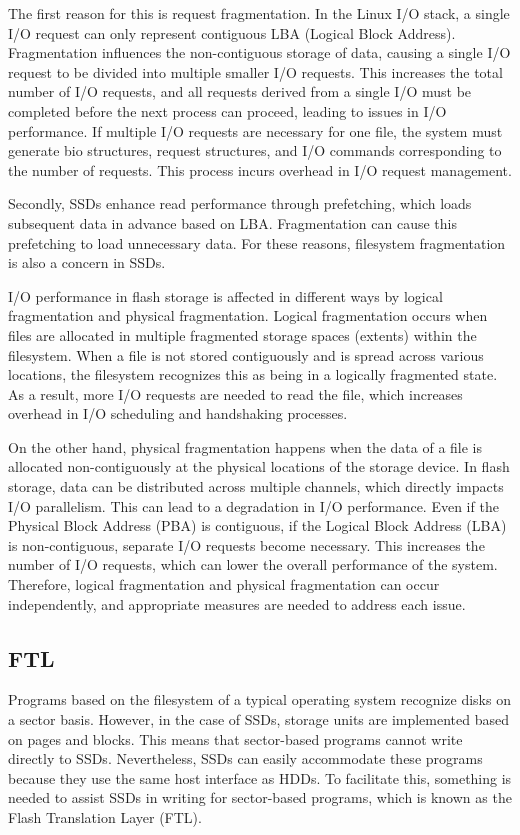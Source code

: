 The first reason for this is request fragmentation.
In the Linux I/O stack, a single I/O request can only represent contiguous LBA (Logical Block Address). 
Fragmentation influences the non-contiguous storage of data, causing a single I/O request to be divided into multiple smaller I/O requests.\cite{IO} 
This increases the total number of I/O requests, and all requests derived from a single I/O must be completed before the next process can proceed, leading to issues in I/O performance.
If multiple I/O requests are necessary for one file, the system must generate bio structures, request structures, and I/O commands corresponding to the number of requests. This process incurs overhead in I/O request management.

Secondly, SSDs enhance read performance through prefetching, which loads subsequent data in advance based on LBA. 
Fragmentation can cause this prefetching to load unnecessary data.\cite{Defragmentation_Log_write_is_ssd_to_bad} For these reasons, filesystem fragmentation is also a concern in SSDs.

 I/O performance in flash storage is affected in different ways by logical fragmentation and physical fragmentation.\cite{Logical_Fragmentation_vs_physical_Fragmentation}
Logical fragmentation occurs when files are allocated in multiple fragmented storage spaces (extents) within the filesystem.
When a file is not stored contiguously and is spread across various locations, the filesystem recognizes this as being in a logically fragmented state. 
As a result, more I/O requests are needed to read the file, which increases overhead in I/O scheduling and handshaking processes.

On the other hand, physical fragmentation happens when the data of a file is allocated non-contiguously at the physical locations of the storage device.
In flash storage, data can be distributed across multiple channels, which directly impacts I/O parallelism. 
This can lead to a degradation in I/O performance. 
Even if the Physical Block Address (PBA) is contiguous, if the Logical Block Address (LBA) is non-contiguous, separate I/O requests become necessary. 
This increases the number of I/O requests, which can lower the overall performance of the system.
Therefore, logical fragmentation and physical fragmentation can occur independently, and appropriate measures are needed to address each issue.

\subsection{FTL}
Programs based on the filesystem of a typical operating system recognize disks on a sector basis.
However, in the case of SSDs, storage units are implemented based on pages and blocks.
This means that sector-based programs cannot write directly to SSDs. 
Nevertheless, SSDs can easily accommodate these programs because they use the same host interface as HDDs.
To facilitate this, something is needed to assist SSDs in writing for sector-based programs, which is known as the Flash Translation Layer (FTL).

